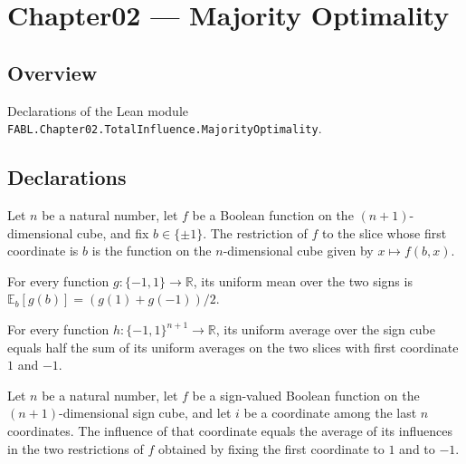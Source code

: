 \chapter{Chapter02 — Majority Optimality}
\section{Overview}

Declarations of the Lean module \texttt{FABL.Chapter02.TotalInfluence.MajorityOptimality}.

\section{Declarations}

\begin{definition}
\label{FABL.firstCoordinateRestriction}
\leanok
{}
Let $n$ be a natural number, let $f$ be a Boolean function on the $(n+1)$-dimensional
cube, and fix $b\in\{\pm1\}$. The restriction of $f$ to the slice whose first coordinate
is $b$ is the function on the $n$-dimensional cube given by $x\mapsto f(b,x)$.
\end{definition}

\begin{theorem}
\label{FABL.expect_sign}
\leanok
{}
For every function $g:\{−1,1\}\to\mathbb R$, its uniform mean over the two signs is
$\mathbb E_b[g(b)]=(g(1)+g(-1))/2$.
\end{theorem}

\begin{theorem}
\label{FABL.expect_fin_cons}
\leanok
{}
For every function $h:\{-1,1\}^{n+1}\to\mathbb R$, its uniform average over the sign
cube equals half the sum of its uniform averages on the two slices with first coordinate
$1$ and $-1$.
\end{theorem}

\begin{theorem}
\label{FABL.booleanInfluence_succ}
\leanok
{}
Let $n$ be a natural number, let $f$ be a sign-valued Boolean function on the
$(n+1)$-dimensional sign cube, and let $i$ be a coordinate among the last $n$
coordinates. The influence of that coordinate equals the average of its influences in
the two restrictions of $f$ obtained by fixing the first coordinate to $1$ and to $-1$.
\end{theorem}

